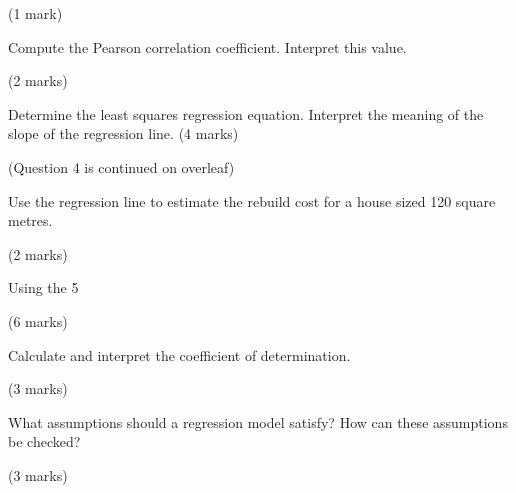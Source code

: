 (1 mark)

\item[(i)] Compute the Pearson correlation coefficient. Interpret this value.

(2 marks)

\item[(ii)] Determine the least squares regression equation. Interpret the meaning of the slope of the regression line. (4 marks)

(Question 4 is continued on overleaf)

\item[(iii)] Use the regression line to estimate the rebuild cost for a house sized 120 square metres.

(2 marks)

\item[(iv)] Using the 5%

(6 marks)

\item[(v)] Calculate and interpret the coefficient of determination.

(3 marks)

\item[(vi)] What assumptions should a regression model satisfy? How can these assumptions be checked?

(3 marks)

